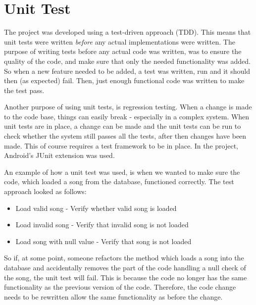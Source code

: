 \section{Unit Test}

The project was developed using a test-driven approach (TDD). This means that unit tests were written \textit{before} any actual implementations were written. The purpose of writing tests before any actual code was written, was to ensure the quality of the code, and make sure that only the needed functionality was added. So when a new feature needed to be added, a test was written, run and it should then (as expected) fail. Then, just enough functional code was written to make the test pass. 

Another purpose of using unit tests, is regression testing. When a change is made to the code base, things can easily break - especially in a complex system. When unit tests are in place, a change can be made and the unit tests can be run to check whether the system still passes all the tests, after then changes have been made. This of course requires a test framework to be in place. In the project, Android's JUnit extension \citet{android:test} was used.

An example of how a unit test was used, is when we wanted to make sure the code, which loaded a song from the database, functioned correctly. The test approach looked as follows:

\begin{itemize}
\item Load valid song
\subitem- Verify whether valid song is loaded
\item Load invalid song
\subitem- Verify that invalid song is not loaded
\item Load song with null value
\subitem- Verify that song is not loaded
\end{itemize} 

So if, at some point, someone refactors the method which loads a song into the database and accidentally removes the part of the code handling a null check of the song, the unit test will fail. This is because the code no longer has the same functionality as the previous version of the code. Therefore, the code change needs to be rewritten allow the same functionality as before the change.

